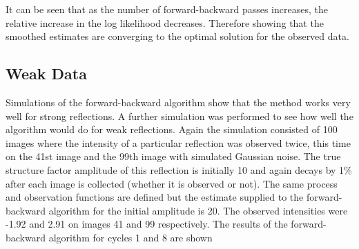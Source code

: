It can be seen that as the number of forward-backward passes increases, the relative increase in the log likelihood decreases.
Therefore showing that the smoothed estimates are converging to the optimal solution for the observed data.

\subsection{Weak Data}
\label{sub:Weak Data}
Simulations of the forward-backward algorithm show that the method works very well for strong reflections.
A further simulation was performed to see how well the algorithm would do for weak reflections.
Again the simulation consisted of 100 images where the intensity of a particular reflection was observed twice, this time on the 41st image and the 99th image with simulated Gaussian noise.
The true structure factor amplitude of this reflection is initially 10 and again decays by 1\% after each image is collected (whether it is observed or not).
The same process and observation functions are defined but the estimate supplied to the forward-backward algorithm for the initial amplitude is 20.
The observed intensities were -1.92 and 2.91 on images 41 and 99 respectively.
The results of the forward-backward algorithm for cycles 1 and 8 are shown
